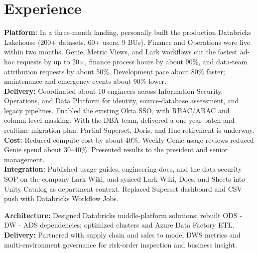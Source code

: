 \documentclass[letterpaper]{deedy-resume}
\begin{document}
\hfill
\begin{minipage}[t]{0.66\textwidth}

\section{Experience}
\vspace{1mm}


\textbf{Platform:} In a three-month landing, personally built the production Databricks Lakehouse (200+ datasets, 60+ users, 9 BUs). Finance and Operations were live within two months. Genie, Metric Views, and Lark workflows cut the fastest ad-hoc requests by up to 20$\times$, finance process hours by about 90\%, and data-team attribution requests by about 50\%. Development pace about 80\% faster; maintenance and emergency events about 90\% lower. \\
\textbf{Delivery:} Coordinated about 10 engineers across Information Security, Operations, and Data Platform for identity, source-database assessment, and legacy pipelines. Enabled the existing Okta SSO, with RBAC/ABAC and column-level masking. With the DBA team, delivered a one-year batch and realtime migration plan. Partial Superset, Doris, and Hue retirement is underway. \\
\textbf{Cost:} Reduced compute cost by about 40\%. Weekly Genie usage reviews reduced Genie spend about 30--40\%. Presented results to the president and senior management. \\
\textbf{Integration:} Published usage guides, engineering docs, and the data-security SOP on the company Lark Wiki, and synced Lark Wiki, Docs, and Sheets into Unity Catalog as department context. Replaced Superset dashboard and CSV push with Databricks Workflow Jobs.

\sectionspace


\textbf{Architecture:} Designed Databricks middle-platform solutions; rebuilt ODS - DW - ADS dependencies; optimized clusters and Azure Data Factory ETL. \\
\textbf{Delivery:} Partnered with supply chain and sales to model DWS metrics and multi-environment governance for risk-order inspection and business insight.


\end{minipage}
\end{document}
